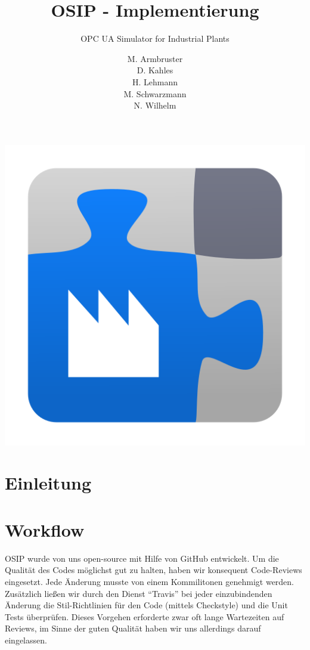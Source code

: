 \documentclass[parskip=full]{scrartcl}
\title{OSIP - Implementierung}
\subtitle{OPC UA Simulator for Industrial Plants}
\author{
    M. Armbruster\\
    D. Kahles\\
    H. Lehmann\\
    M. Schwarzmann\\
    N. Wilhelm
}
\begin{document}
\maketitle
\thispagestyle{empty}
\vspace{20px}
\begin{center}
  \includegraphics[scale=0.4]{../icon.png}
\end{center}
\pagebreak
\tableofcontents
\pagebreak

\section{Einleitung}


\section{Workflow}
OSIP wurde von uns open-source mit Hilfe von GitHub entwickelt. Um die Qualität des Codes möglichst gut zu halten,
haben wir konsequent Code-Reviews eingesetzt. Jede Änderung musste von einem Kommilitonen genehmigt werden. Zusätzlich ließen wir
durch den Dienst "`Travis"' bei jeder einzubindenden Änderung die Stil-Richtlinien für den Code (mittels Checkstyle) und die Unit Tests überprüfen.
Dieses Vorgehen erforderte zwar oft lange Wartezeiten auf Reviews, im Sinne der guten Qualität haben wir uns allerdings darauf eingelassen. 
\end{document}
